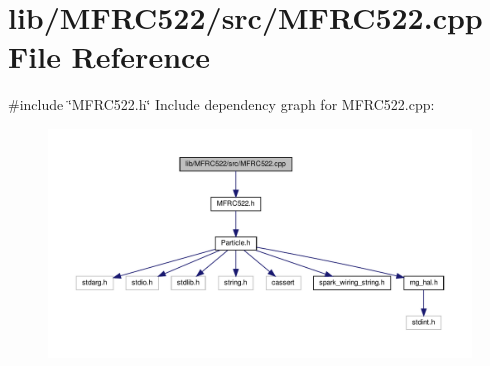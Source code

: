 \section{lib/\+M\+F\+R\+C522/src/\+M\+F\+R\+C522.cpp File Reference}
\label{_m_f_r_c522_8cpp}
{\ttfamily \#include \char`\"{}M\+F\+R\+C522.\+h\char`\"{}}\newline
Include dependency graph for M\+F\+R\+C522.\+cpp\+:\nopagebreak
\begin{figure}[H]
\begin{center}
\leavevmode
\includegraphics[width=350pt]{_m_f_r_c522_8cpp__incl}
\end{center}
\end{figure}
